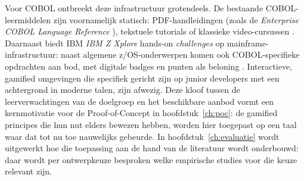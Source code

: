 Voor COBOL ontbreekt deze infrastructuur grotendeels. 
De bestaande COBOL-leermiddelen zijn voornamelijk statisch: PDF-handleidingen (zoals de \textit{Enterprise COBOL Language Reference} \autocite{IBM2023}), tekstuele tutorials of klassieke video-\allowbreak cursussen \autocite{IBMMainframer2021}. 
Daarnaast biedt IBM \textit{IBM Z Xplore} hands-on \textit{challenges} op mainframe-infrastructuur: naast algemene z/OS-onderwerpen komen ook COBOL-specifieke opdrachten aan bod, met digitale badges en punten als beloning \autocite{IBMZXplore2026}.
Interactieve, gamified omgevingen die specifiek gericht zijn op junior developers met een achtergrond in moderne talen, zijn afwezig. 
Deze kloof tussen de leerverwachtingen van de doelgroep en het beschikbare aanbod vormt een kernmotivatie voor de Proof-of-Concept in hoofdstuk~\ref{ch:poc}: de gamified principes die hun nut elders bewezen hebben, worden hier toegepast op een taal waar dat tot nu toe nauwelijks gebeurde.
In hoofdstuk~\ref{ch:evaluatie} wordt uitgewerkt hoe die toepassing aan de hand van de literatuur wordt onderbouwd: daar wordt per ontwerpkeuze besproken welke empirische studies voor die keuze relevant zijn.